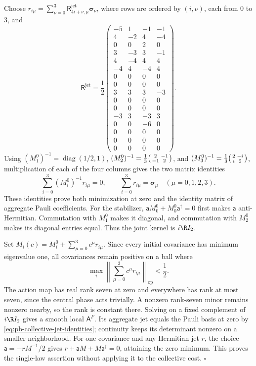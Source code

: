 Choose \(r_{i\mu}=\sum_{\nu=0}^3\mathsf R^{\mathrm{jet}}_{4i+\nu,\mu}
\boldsymbol\sigma_\nu\), where rows are ordered by \((i,\nu)\), each from \(0\) to \(3\), and
\begin{equation}
\mathsf R^{\mathrm{jet}}=\frac12
\begin{pmatrix}
-5&1&-1&-1\\ 4&-2&4&-4\\ 0&0&2&0\\ 3&-3&3&-1\\
4&-4&4&4\\ -4&4&-4&4\\ 0&0&0&0\\ 0&0&0&0\\
3&3&3&-3\\ 0&0&0&0\\ 0&0&0&0\\ -3&3&-3&3\\
0&0&-6&0\\ 0&0&0&0\\ 0&0&0&0\\ 0&0&0&0
\end{pmatrix}.
\label{eq:pb-collective-rational-jets}
\end{equation}
Using \((M_1^0)^{-1}=\operatorname{diag}(1/2,1)\),
\((M_2^0)^{-1}=\tfrac13\begin{psmallmatrix}2&-1\\-1&2\end{psmallmatrix}\), and
\((M_3^0)^{-1}=\tfrac13\begin{psmallmatrix}2&-i\\i&2\end{psmallmatrix}\), multiplication of
each of the four columns gives the two matrix identities
\begin{equation}
\sum_{i=0}^3(M_i^0)^{-1}r_{i\mu}=0,\qquad
\sum_{i=0}^3r_{i\mu}=\boldsymbol\sigma_\mu\quad(\mu=0,1,2,3).
\label{eq:pb-collective-jet-identities}
\end{equation}
These identities prove both minimization at zero and the identity matrix of aggregate Pauli
coefficients. For the stabilizer, \(\mathsf aM_0^0+M_0^0\mathsf a^\dagger=0\) first makes
\(\mathsf a\) anti-Hermitian. Commutation with \(M_1^0\) makes it diagonal, and commutation with
\(M_2^0\) makes its diagonal entries equal. Thus the joint kernel is \(i\R I_2\).

Set \(M_i(c)=M_i^0+\sum_{\mu=0}^3c^\mu r_{i\mu}\). Since every initial covariance has
minimum eigenvalue one, all covariances remain positive on a ball where
\[
\max_i\left\|\sum_{\mu=0}^3c^\mu r_{i\mu}\right\|_{\mathrm{op}}<\frac12.
\]
The action map has real rank seven at zero and everywhere has rank at most seven,
since the central phase acts trivially. A nonzero rank-seven minor remains nonzero nearby, so
the rank is constant there. Solving on a fixed complement of \(i\R I_2\) gives a smooth local
\(\mathsf A^F\). Its aggregate jet equals the Pauli basis at zero by
\cref{eq:pb-collective-jet-identities}; continuity keeps its determinant nonzero on a smaller
neighborhood. For one covariance and any Hermitian jet \(r\), the choice
\(\mathsf a=-rM^{-1}/2\) gives \(r+\mathsf aM+M\mathsf a^\dagger=0\), attaining the zero
minimum. This proves the single-law assertion without applying it to the collective cost.
\hfill$\square$

